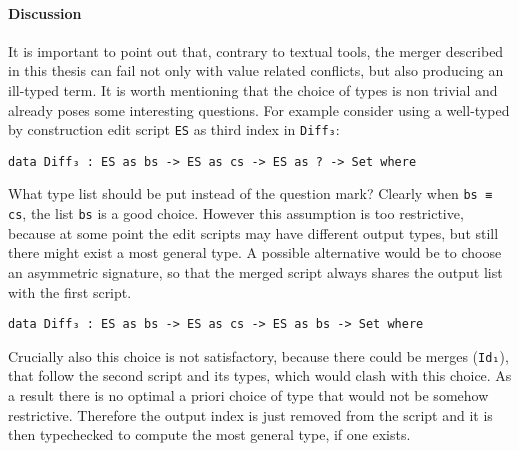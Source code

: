 \documentclass[../Thesis.tex]{subfiles}
\begin{document}
	\paragraph{Discussion}
	It is important to point out that, contrary to textual tools, 
	the merger described in this thesis can fail 
	not only with value related conflicts, but also producing
	an ill-typed term.
	It is worth mentioning that the choice of types is non trivial and
	already poses some interesting questions.
	For example consider using a well-typed by construction edit script 
	\texttt{ES} as third index in \texttt{Diff₃}:

\begin{verbatim}
data Diff₃ : ES as bs -> ES as cs -> ES as ? -> Set where
\end{verbatim}	
	What type list should be put instead of the question mark?
	Clearly when \texttt{bs ≡ cs}, the list \texttt{bs} is a good choice.
	However this assumption is too restrictive, because at some
	point the edit scripts may have different output types, but still there might 
	exist a most general type.
	A possible alternative would be to choose an asymmetric signature,
	so that the merged script always shares the output list with the first script.
\begin{verbatim}
data Diff₃ : ES as bs -> ES as cs -> ES as bs -> Set where
\end{verbatim}	
	Crucially also this choice is not satisfactory, because 
	there could be merges (\texttt{Id₁}), that follow the second script and its 
	types, which would clash with this choice.
	As a result there is no optimal a priori choice of type that would not
	be somehow restrictive. Therefore the output index is just removed from
	the script and it is then typechecked to compute the most general type,
	if one exists.	  
		
\end{document}
